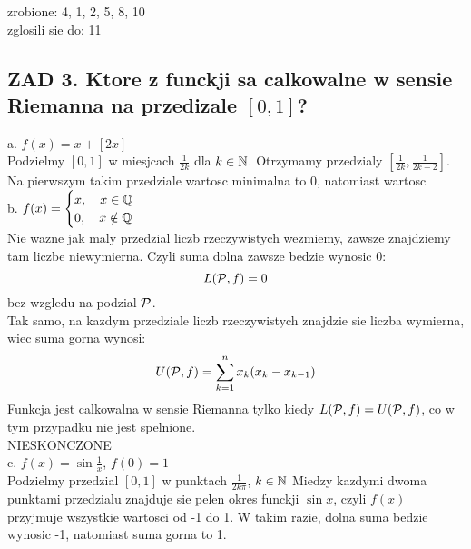 \documentclass{article}
\begin{document}
\ttfamily
    zrobione: 4, 1, 2, 5, 8, 10\\
    zglosili sie do: 11
\subsection*{ZAD 3. Ktore z funckji sa calkowalne w sensie Riemanna na przedizale $[0,1]$?}
\indent a. $f(x)=x+[2x]$\medskip\\
    Podzielmy $[0,1]$ w miesjcach $\frac1{2k}$ dla $k\in\mathbb{N}$. Otrzymamy przedzialy $[\frac1{2k}, \frac1{2k-2}]$. Na pierwszym takim przedziale wartosc minimalna to 0, natomiast wartosc\bigskip\\
\indent b. $f(x)=\begin{cases}x,\quad x\in\mathbb{Q}\\0,\quad x\notin\mathbb{Q}\end{cases}$\medskip\\
    Nie wazne jak maly przedzial liczb rzeczywistych wezmiemy, zawsze znajdziemy tam liczbe niewymierna. Czyli suma dolna zawsze bedzie wynosic 0:
    $$L(\mathcal{P},f)=0$$
    bez wzgledu na podzial $\mathcal{P}$. \smallskip\\
    Tak samo, na kazdym przedziale liczb rzeczywistych znajdzie sie liczba wymierna, wiec suma gorna wynosi:
    $$U(\mathcal{P}, f)=\sum\limits_{k=1}^nx_k(x_k-x_{k-1})$$
    Funkcja jest calkowalna w sensie Riemanna tylko kiedy $L(\mathcal{P},f)=U(\mathcal{P},f)$, co w tym przypadku nie jest spelnione.\\\color{emp}NIESKONCZONE\color{txt}\bigskip\\
\indent c. $f(x)=\sin\frac1x$, $f(0)=1$\medskip\\
    Podzielmy przedzial $[0,1]$ w punktach $\frac1{2k\pi}$, $k\in\mathbb{N}$ Miedzy kazdymi dwoma punktami przedzialu znajduje sie pelen okres funckji $\sin x$, czyli $f(x)$ przyjmuje wszystkie wartosci od -1 do 1. W takim razie, dolna suma bedzie wynosic -1, natomiast suma gorna to 1.
\end{document}
